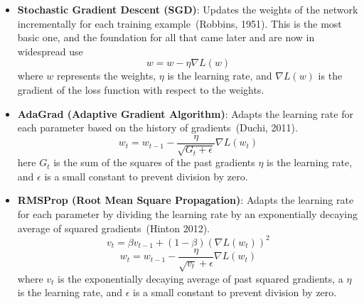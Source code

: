 \documentclass[a4paper, 11pt]{report}
\begin{document}
\begin{itemize}
\item \textbf{Stochastic Gradient Descent (SGD)}: Updates the weights of the network incrementally for each training example~\cite{Robbins1951_SGD}(Robbins, 1951). This is the most basic one, and the foundation for all that came later and are now in widespread use
\begin{equation*}
w = w - \eta \nabla L(w)
\end{equation*}
where $w$ represents the weights, $\eta$ is the learning rate, and $\nabla L(w)$ is the gradient of the loss function with respect to the weights.

\item \textbf{AdaGrad (Adaptive Gradient Algorithm)}: Adapts the learning rate for each parameter based on the history of gradients~\cite{Duchi2011_AdaGrad}(Duchi, 2011).
\begin{equation*}
w_t = w_{t-1} - \frac{\eta}{\sqrt{G_t + \epsilon}} \nabla L(w_t)
\end{equation*}
here $G_t$ is the sum of the squares of the past gradients  \(\eta\) is the learning rate, and \(\epsilon\) is a small constant to prevent division by zero.

\item \textbf{RMSProp (Root Mean Square Propagation)}: Adapts the learning rate for each parameter by dividing the learning rate by an exponentially decaying average of squared gradients~\cite{Hinton2012_RMSProp}(Hinton 2012).
\begin{equation*}
v_t = \beta v_{t-1} + (1 - \beta) (\nabla L(w_t))^2
\end{equation*}
\begin{equation*}
w_t = w_{t-1} - \frac{\eta}{\sqrt{v_t} + \epsilon} \nabla L(w_t)
\end{equation*}
where $v_t$ is the exponentially decaying average of past squared gradients, a \(\eta\) is the learning rate, and \(\epsilon\) is a small constant to prevent division by zero.


\end{itemize}
\end{document}
